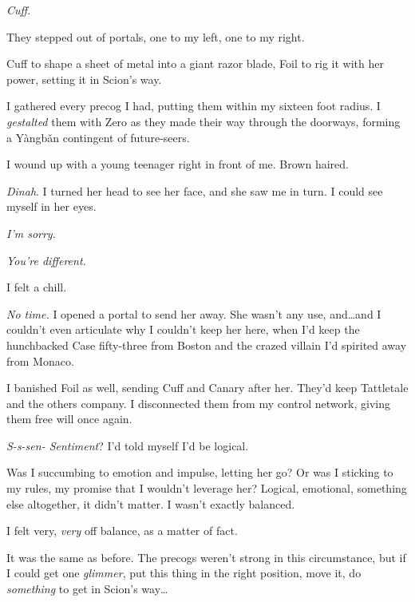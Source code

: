 \emph{Cuff}.



They stepped out of portals, one to my left, one to my right.



Cuff to shape a sheet of metal into a giant razor blade, Foil to rig it with her power, setting it in Scion's way.



I gathered every precog I had, putting them within my sixteen foot radius. I \emph{gestalted }them with Zero as they made their way through the doorways, forming a Y\`{a}ngb\v{a}n contingent of future-seers.



I wound up with a young teenager right in front of me.  Brown haired.



\emph{Dinah}.  I turned her head to see her face, and she saw me in turn.  I could see myself in her eyes.



\emph{I'm sorry}.



\emph{You're different.}



I felt a chill.



\emph{No time.  }I opened a portal to send her away.  She wasn't any use, and\ldots and I couldn't even articulate why I couldn't keep her here, when I'd keep the hunchbacked Case fifty-three from Boston and the crazed villain I'd spirited away from Monaco.



I banished Foil as well, sending Cuff and Canary after her.  They'd keep Tattletale and the others company.  I disconnected them from my control network, giving them free will once again.



\emph{S-s-sen- Sentiment}?  I'd told myself I'd be logical.



Was I succumbing to emotion and impulse, letting her go?  Or was I sticking to my rules, my promise that I wouldn't leverage her?  Logical, emotional, something else altogether, it didn't matter.  I wasn't exactly balanced.



I felt very, \emph{very} off balance, as a matter of fact.



It was the same as before.  The precogs weren't strong in this circumstance, but if I could get one \emph{glimmer}, put this thing in the right position, move it, do \emph{something} to get in Scion's way\ldots



